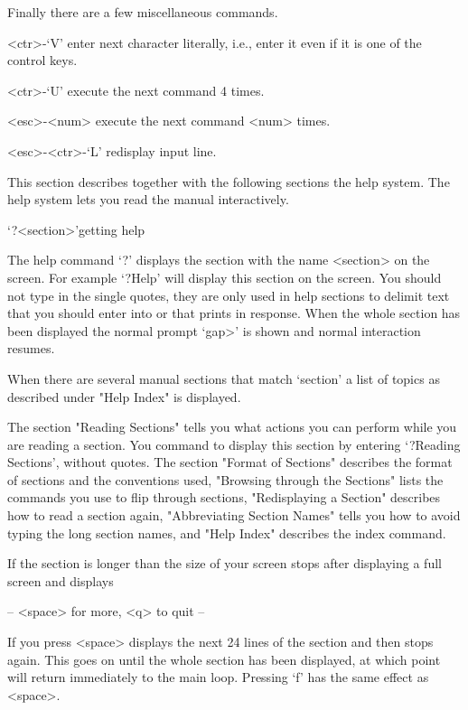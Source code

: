Finally there are a few miscellaneous commands.

<ctr>-`V' enter next character literally, i.e., enter it even if it
  is one of the control keys.

<ctr>-`U' execute the next command 4 times.

<esc>-<num> execute the next command <num> times.

<esc>-<ctr>-`L' redisplay input line.


This section describes together with the following sections the {\GAP}
help system. The help system lets you read the manual interactively.

\>`?<section>'{getting help}

The help command `?' displays the section with the name <section> on the
screen. For example `?Help' will display this section on the screen.
You should not type in the single quotes, they are only used in help
sections to delimit text that you should enter into {\GAP} or that {\GAP}
prints in response. When the whole section has been displayed the normal
{\GAP} prompt `gap>' is shown and normal {\GAP} interaction resumes.

When there are several manual sections that match `section' a list of topics
as described under "Help Index" is displayed.

The section "Reading Sections" tells you what actions you can perform
while you are reading a section. You command {\GAP} to display this
section by entering `?Reading Sections', without quotes. The section
"Format of Sections" describes the format of sections and the conventions
used, "Browsing through the Sections" lists the commands you use to flip
through sections, "Redisplaying a Section" describes how to read a
section again, "Abbreviating Section Names" tells you how to avoid typing
the long section names, and "Help Index" describes the index command.


If the section is longer than the size of your screen {\GAP} stops after
displaying a full screen and displays

\begintt
-- <space> for more, <q> to quit --
\endtt

If you press <space> {\GAP} displays the next 24 lines of the section and
then stops again. This goes on until the whole section has been
displayed, at which point {\GAP} will return immediately to the main
{\GAP} loop. Pressing `f' has the same effect as <space>.

